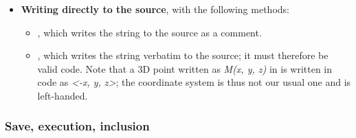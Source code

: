 \begin{itemize}
\begin{itemize}
            \item {}, where  is a list of \povray objects; these objects may be either the name of an already created object or a \povray command given as a string. The result is the common part of these objects.
            
            \item {}, where  is a list of \povray objects; these objects may be either the name of an already created object or a \povray command given as a string. This command works like union, but removes internal surfaces (unlike union), which is useful in the case of transparency.
            
            \item {}, where  is a list of \povray objects; these objects may be either the name of an already created object or a \povray command given as a string. The result is the difference: ((object1 minus object2) minus object3) etc.
        \end{itemize}
    
    \item \textbf{Writing directly to the source}, with the following methods:
        \begin{itemize}
            \item {}, which writes the string  to the source as a comment.
            \item {}, which writes the string  verbatim to the source; it must therefore be valid \povray code. Note that a 3D point written as \emph{M(x, y, z)} in \luadrawenv is written in \povray code as \emph{<-x, y, z>}; the \povray coordinate system is thus not our usual one and is left-handed.
        \end{itemize}
\end{itemize}

\subsubsection{Save, execution, inclusion}

